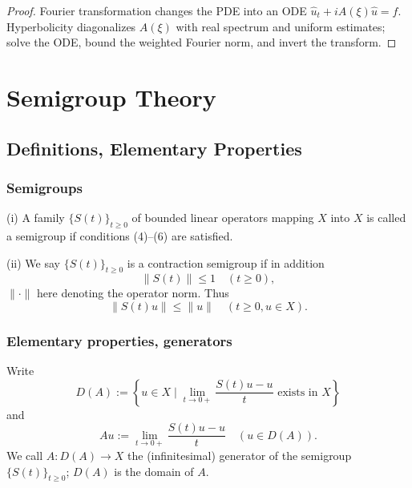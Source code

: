 \begin{proof}
\sketch Fourier transformation changes the PDE into an ODE $\hat u_t+iA(\xi)\hat u=\hat f$. Hyperbolicity diagonalizes $A(\xi)$ with real spectrum and uniform estimates; solve the ODE, bound the weighted Fourier norm, and invert the transform.
\end{proof}

\section{Semigroup Theory}
\label{sec:semigroup-theory}

\subsection{Definitions, Elementary Properties}

\subsubsection{Semigroups}

\begin{definition}
\label{def:semigroup-contraction-semigroup}
(i) A family $\{S(t)\}_{t \geq 0}$ of bounded linear operators mapping $X$ into $X$ is called a semigroup if conditions (4)--(6) are satisfied.

(ii) We say $\{S(t)\}_{t \geq 0}$ is a contraction semigroup if in addition
\[
\|S(t)\| \leq 1 \quad (t \geq 0),
\tag{7}
\]
$\|\cdot\|$ here denoting the operator norm. Thus
\[
\|S(t)u\| \leq \|u\| \quad (t \geq 0, u \in X).
\]
\end{definition}

\subsubsection{Elementary properties, generators}

\begin{definition}
\label{def:semigroup-generator}

Write
\[
D(A) := \left\{u \in X \mid \lim_{t \to 0+} \frac{S(t)u - u}{t} \text{ exists in } X\right\}
\tag{8}
\]
and
\[
Au := \lim_{t \to 0+} \frac{S(t)u - u}{t} \quad (u \in D(A)).
\tag{9}
\]
We call $A : D(A) \to X$ the (infinitesimal) generator of the semigroup $\{S(t)\}_{t \geq 0}$; $D(A)$ is the domain of $A$.
\end{definition}

